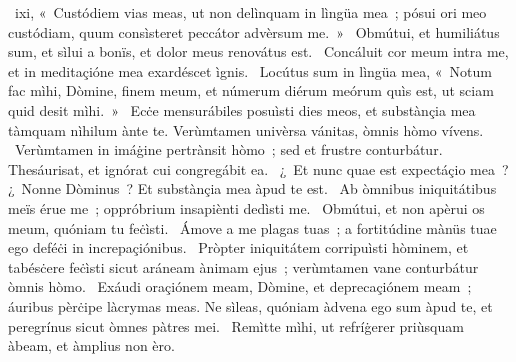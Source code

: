 { }
{%
~ixi, «~Custódiem vias meas, ut non delìnquam in lìngüa mea~; pósui ori meo custódiam, quum consìsteret peccátor advèrsum me.~»
~Obmútui, et humiliátus sum, et sìlui a bonïs, et dolor meus renovátus est. 
~Concáluit cor meum intra me, et in meditaçióne mea exardéscet ìgnis. 
~Locútus sum in lìngüa mea, «~Notum fac mìhi, Dòmine, finem meum, et númerum diérum meórum quìs est, ut sciam quid desit mìhi.~»
~Ecċe mensurábiles posuìsti dies meos, et substànçia mea tàmquam nìhilum ànte te. Verùmtamen univèrsa vánitas, òmnis hòmo vívens. 
~Verùmtamen in imáġine pertrànsit hòmo~; sed et frustre conturbátur. Thesáurisat, et ignórat cui congregábit ea. 
~¿~Et nunc quae est expectáçio mea~? ¿~Nonne Dòminus~? Et substànçia mea àpud te est. 
~Ab òmnibus iniquitátibus meïs érue me~; oppróbrium insapiènti dedìsti me. 
~Obmútui, et non apèrui os meum, quóniam tu feċìsti. 
~Ámove a me plagas tuas~; a fortitúdine mànüs tuae ego deféċi in increpaçiónibus. 
~Pròpter iniquitátem corripuìsti hòminem, et tabésċere feċìsti sicut aráneam ànimam ejus~; verùmtamen vane conturbátur òmnis hòmo. 
~Exáudi oraçiónem meam, Dòmine, et deprecaçiónem meam~; áuribus pèrċipe làcrymas meas. Ne sìleas, quóniam àdvena ego sum àpud te, et peregrínus sicut òmnes pàtres mei. 
~Remìtte mìhi, ut refríġerer priùsquam àbeam, et àmplius non èro. 
}
